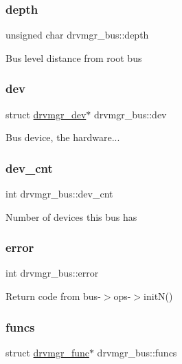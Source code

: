 \subsubsection{\texorpdfstring{depth}{depth}}
{\footnotesize\ttfamily unsigned char drvmgr\+\_\+bus\+::depth}

Bus level distance from root bus \mbox{\label{structdrvmgr__bus_a6352e29d34c91a1ad459afe30b1e812b}} 
\subsubsection{\texorpdfstring{dev}{dev}}
{\footnotesize\ttfamily struct \mbox{\hyperlink{structdrvmgr__dev}{drvmgr\+\_\+dev}}$\ast$ drvmgr\+\_\+bus\+::dev}

Bus device, the hardware... \mbox{\label{structdrvmgr__bus_a91de472d59f5d1418b638cb256d4c5e5}} 
\subsubsection{\texorpdfstring{dev\_cnt}{dev\_cnt}}
{\footnotesize\ttfamily int drvmgr\+\_\+bus\+::dev\+\_\+cnt}

Number of devices this bus has \mbox{\label{structdrvmgr__bus_a0c3cf01c0652fa8e31512571114a0863}} 
\subsubsection{\texorpdfstring{error}{error}}
{\footnotesize\ttfamily int drvmgr\+\_\+bus\+::error}

Return code from bus-\/$>$ops-\/$>$init\+N() \mbox{\label{structdrvmgr__bus_a09cf5ec1ab115e27fa8a6e6b63323cc0}} 
\subsubsection{\texorpdfstring{funcs}{funcs}}
{\footnotesize\ttfamily struct \mbox{\hyperlink{structdrvmgr__func}{drvmgr\+\_\+func}}$\ast$ drvmgr\+\_\+bus\+::funcs}

